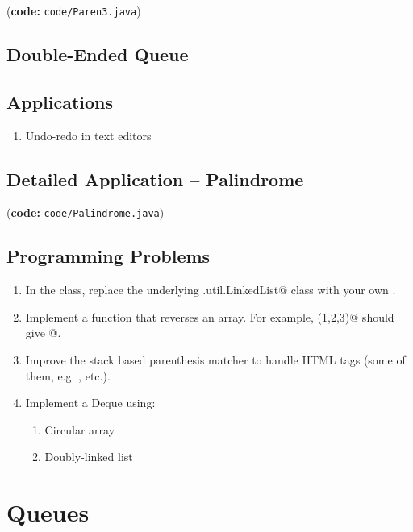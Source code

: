 \documentclass[12pt,a4paper]{article}
\begin{document}
(\textbf{code:} \texttt{code/Paren3.java})


\subsection{Double-Ended Queue}
\subsection{Applications}
\begin{enumerate}
\item Undo-redo in text editors
\end{enumerate}
\subsection{Detailed Application -- Palindrome}

(\textbf{code:} \texttt{code/Palindrome.java})

\subsection{Programming Problems}
\begin{enumerate}

\item In the \lstinline@MyStack@ class, replace the underlying \lstinline@list.util.LinkedList@ class with your own \lstinline@LinkedList@.
\item Implement a function \lstinline@reverseArray@ that reverses an array. For example, \lstinline@reverseArray({1,2,3})@ should give @. 
\item Improve the stack based parenthesis matcher to handle HTML tags (some of them, e.g. \lstinline@body@, \lstinline@title@ etc.).
\item Implement a Deque using:
\begin{enumerate}
	\item Circular array
	\item Doubly-linked list
\end{enumerate}
\end{enumerate}

\section{Queues}
\end{document}
